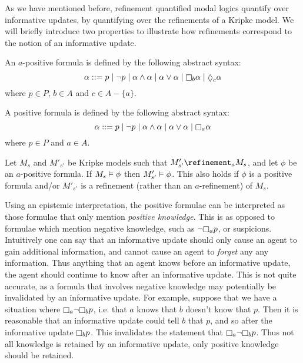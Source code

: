 As we have mentioned before, refinement quantified modal logics quantify over
informative updates, by quantifying over the refinements of a Kripke model. We
will briefly introduce two properties to illustrate how refinements correspond
to the notion of an informative update.

\begin{definition}
An $a$-positive formula is defined by the following abstract syntax:
$$
\alpha ::=  p \bnfalt
            \neg p \bnfalt
            \alpha \land \alpha \bnfalt
            \alpha \lor \alpha \bnfalt
            \knows_b \alpha \bnfalt
            \suspects_c \alpha
$$
where $p \in P$, $b \in A$ and $c \in A - \{a\}$.

A positive formula is defined by the following abstract syntax:
$$
\alpha ::=    p \bnfalt 
            \neg p \bnfalt
            \alpha \land \alpha \bnfalt
            \alpha \lor \alpha \bnfalt
            \knows_a \alpha
$$
where $p \in P$ and $a \in A$.
\end{definition}

\begin{proposition}
Let $M_s$ and $M'_{s'}$ be Kripke models such that $M'_{s'} \refinement_a M_s$,
and let $\phi$ be an $a$-positive formula. If $M_s \vDash \phi$ then $M'_{s'}
\vDash \phi$. This also holds if $\phi$ is a positive formula and/or $M'_{s'}$
is a refinement (rather than an $a$-refinement) of $M_s$.
\end{proposition}

Using an epistemic interpretation, the positive formulae can be interpreted as
those formulae that only mention {\em positive knowledge}. This is as opposed to
formulae which mention negative knowledge, such as $\neg \knows_a p$, or
suspicions. Intuitively one can say that an informative update should only cause
an agent to gain additional information, and cannot cause an agent to {\em
forget} any any information. Thus anything that an agent knows before an
informative update, the agent should continue to know after an informative
update.  This is not quite accurate, as a formula that involves negative
knowledge may potentially be invalidated by an informative update. For example,
suppose that we have a situation where $\knows_a \neg \knows_b p$, i.e. that $a$
knows that $b$ doesn't know that $p$. Then it is reasonable that an informative
update could tell $b$ that $p$, and so after the informative update $\knows_b
p$. This invalidates the statement that $\knows_a \neg \knows_b p$. Thus not all
knowledge is retained by an informative update, only positive knowledge should
be retained.

